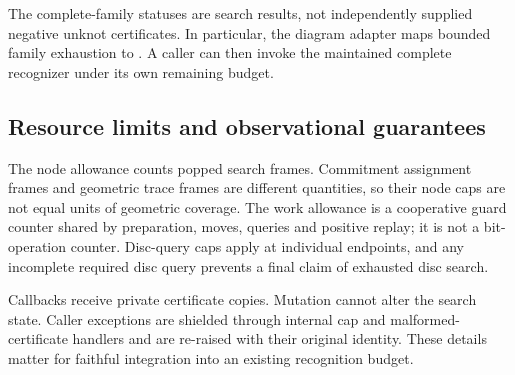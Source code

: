 The complete-family statuses are search results, not independently supplied
negative unknot certificates. In particular, the diagram adapter maps bounded
family exhaustion to . A caller can then invoke the
maintained complete recognizer under its own remaining budget.

\subsection{Resource limits and observational guarantees}

The node allowance counts popped search frames. Commitment assignment frames
and geometric trace frames are different quantities, so their node caps are
not equal units of geometric coverage. The work allowance is a cooperative
guard counter shared by preparation, moves, queries and positive replay;
it is not a bit-operation counter. Disc-query caps apply at individual
endpoints, and any incomplete required disc query prevents a final claim
of exhausted disc search.

Callbacks receive private certificate copies. Mutation cannot alter the
search state. Caller exceptions are shielded through internal cap and
malformed-certificate handlers and are re-raised with their original
identity. These details matter for faithful integration into an existing
recognition budget.
